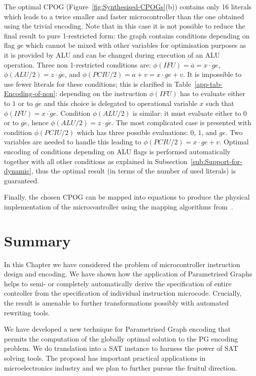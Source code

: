 The optimal CPOG (Figure~\ref{fig:Synthesised-CPOGs}(b)) contains
only 16 literals which leads to a twice smaller and faster microcontroller
than the one obtained using the trivial encoding. Note that in this
case it is not possible to reduce the final result to pure 1-restricted
form: the graph contains conditions depending on flag $ge$ which
cannot be mixed with other variables for optimisation purposes as
it is provided by ALU and can be changed during execution of an ALU
operation. Three non 1-restricted conditions are: $\phi(IFU)=\overline{a}=\overline{x\cdot ge}$,
$\phi(ALU/2)=z\cdot\overline{ge}$, and $\phi(PCIU/2)=a+v=x\cdot ge+v$.
It is impossible to use fewer literals for these conditions; this
is clarified in Table~\ref{app-tab-Encoding-of-non}: depending on
the instruction $\phi(IFU)$ has to evaluate either to $1$ or to
$\overline{ge}$ and this choice is delegated to operational variable
$x$ such that $\phi(IFU)=\overline{x\cdot ge}$. Condition $\phi(ALU/2)$
is similar: it must evaluate either to $0$ or to $\overline{ge}$,
hence $\phi(ALU/2)=z\cdot\overline{ge}$. The most complicated case
is presented with condition $\phi(PCIU/2)$ which has three possible
evaluations: $0$, $1$, and $ge$. Two variables are needed to handle
this leading to $\phi(PCIU/2)=x\cdot ge+v$. Optimal encoding of conditions
depending on ALU flags is performed automatically together with all
other conditions as explained in Subsection~\ref{sub:Support-for-dynamic},
thus the optimal result (in terms of the number of used literals)
is guaranteed.

Finally, the chosen CPOG can be mapped into equations to produce the
physical implementation of the microcontroller using the mapping algorithms
from~\cite{2009_mokhov_phd}\cite{2010_mokhov_ieee}.

\section{Summary}

In this Chapter we have considered the problem of microcontroller instruction design and encoding. We have shown how the application of Parametrised Graphs helps to semi- or completely automatically derive the specification of entire controller from the specification of individual instruction microcode. Crucially, the result is amenable to further transformations possibly with automated rewriting tools. 

We have developed a new technique for Parametrised Graph encoding that permits the computation of the globally optimal solution to the PG encoding problem. We do translation into a SAT instance to harness the power of SAT solving tools. The proposal has important practical applications in microelectronics industry and we plan to further pursue the fruitul direction.
